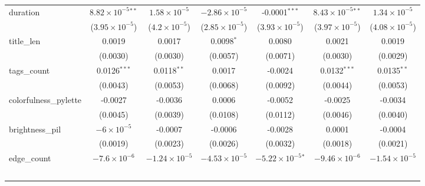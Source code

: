 \begin{table}[htbp]
\begin{tabular}{lcccccc}
      duration                       & $8.82\times 10^{-5}$$^{**}$  & $1.58\times 10^{-5}$    & $-2.86\times 10^{-5}$   & -0.0001$^{***}$              & $8.43\times 10^{-5}$$^{**}$  & $1.34\times 10^{-5}$\\    
                                     & ($3.95\times 10^{-5}$)       & ($4.2\times 10^{-5}$)   & ($2.85\times 10^{-5}$)  & ($3.93\times 10^{-5}$)       & ($3.97\times 10^{-5}$)       & ($4.08\times 10^{-5}$)\\    
      title\_len                     & 0.0019                       & 0.0017                  & 0.0098$^{*}$            & 0.0080                       & 0.0021                       & 0.0019\\   
                                     & (0.0030)                     & (0.0030)                & (0.0057)                & (0.0071)                     & (0.0030)                     & (0.0029)\\   
      tags\_count                    & 0.0126$^{***}$               & 0.0118$^{**}$           & 0.0017                  & -0.0024                      & 0.0132$^{***}$               & 0.0135$^{**}$\\   
                                     & (0.0043)                     & (0.0053)                & (0.0068)                & (0.0092)                     & (0.0044)                     & (0.0053)\\   
      colorfulness\_pylette          & -0.0027                      & -0.0036                 & 0.0006                  & -0.0052                      & -0.0025                      & -0.0034\\   
                                     & (0.0045)                     & (0.0039)                & (0.0108)                & (0.0112)                     & (0.0046)                     & (0.0040)\\   
      brightness\_pil                & $-6\times 10^{-5}$           & -0.0007                 & -0.0006                 & -0.0028                      & 0.0001                       & -0.0004\\   
                                     & (0.0019)                     & (0.0023)                & (0.0026)                & (0.0032)                     & (0.0018)                     & (0.0021)\\   
      edge\_count                    & $-7.6\times 10^{-6}$         & $-1.24\times 10^{-5}$   & $-4.53\times 10^{-5}$   & $-5.22\times 10^{-5}$$^{*}$  & $-9.46\times 10^{-6}$        & $-1.54\times 10^{-5}$\\    
$$
\end{tabular}
\end{table}
